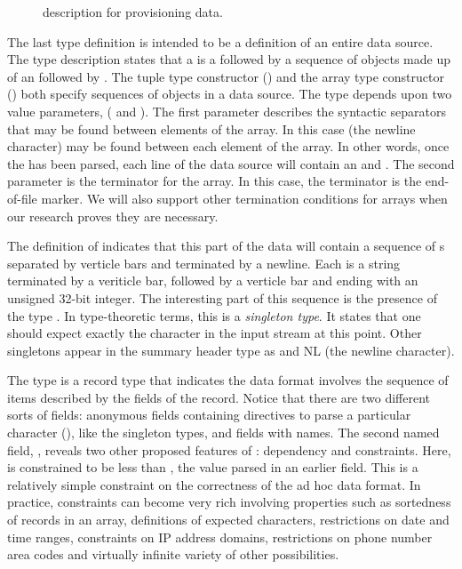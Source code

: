 \documentclass{entcs}
\begin{document}
\suppressfloats

\begin{figure}
\begin {code}

\end{code}
\caption{\datatype{} description for \dibbler{} provisioning data.}
\label{figure:dibblerml}
\end{figure}

The last type definition  is intended to be a definition of
an entire \dibbler{} data source.  The type description states that a
 is a  followed by a sequence of
objects made up of an  followed by .  The
tuple type constructor () and the array type constructor
() both specify sequences of objects in a data
source.  The  type depends upon two value parameters,
( and ).  The first parameter describes the syntactic
separators that may be found between elements of the array.  In this
case  (the newline character) may be found between each element
of the array.  In other words, once the  has been
parsed, each line of the data source will contain an
 and .  The second parameter is the
terminator for the array.  In this case, the terminator is the
end-of-file marker.  We will also support other termination conditions
for arrays when our research proves they are necessary.

The definition of  indicates that this part of the
\dibbler{} data will contain a sequence of s separated by
verticle bars and terminated by a newline.  Each  is a
string terminated by a veriticle bar, followed by a verticle bar and
ending with an unsigned 32-bit integer.  The interesting part of this
sequence is the presence of the type .  In type-theoretic
terms, this is a {\em singleton type}.  It states that one should
expect exactly the character  in the input stream at this
point.  Other singletons appear in the summary header type as
 and NL (the newline character).

The type  is a record type that indicates
the data format involves the sequence of items described by
the fields of the record.  Notice that there are two different
sorts of fields: anonymous fields containing directives to parse
a particular character (), like the singleton types,
and fields with names.  The second named field,
, reveals two other proposed features of 
\datatype: dependency and constraints.  Here,
 is constrained to be less than
, the value parsed in an earlier field.
This is a relatively simple constraint on the correctness of the
ad hoc data format.  In practice, constraints can become very rich
involving properties such as sortedness of records in an array,
definitions of expected characters,
restrictions on date and time ranges, constraints on IP address
domains, restrictions on phone number area codes and virtually 
infinite variety of other possibilities. 
\end{document}
